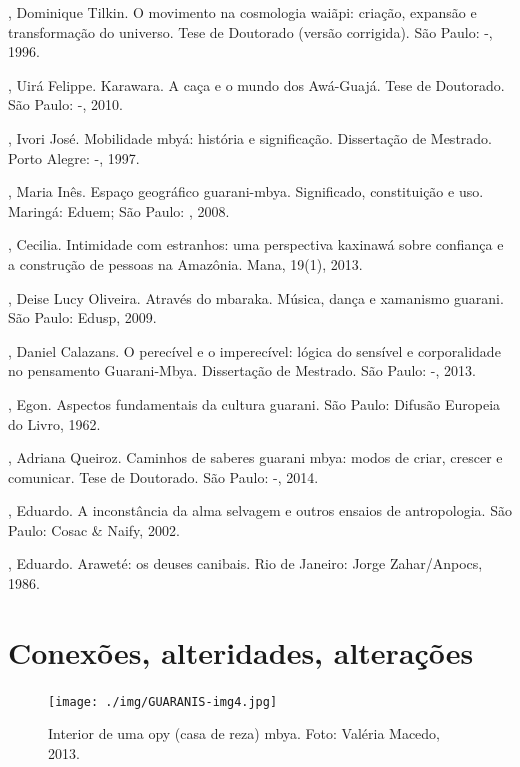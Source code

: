 \begin{Parskip}
, Dominique Tilkin. O movimento na cosmologia waiãpi:
criação, expansão e transformação do universo. Tese de Doutorado
(versão corrigida). São Paulo: -, 1996.

, Uirá Felippe. Karawara. A caça e o mundo dos Awá-Guajá.
Tese de Doutorado. São Paulo: -, 2010.

, Ivori José. Mobilidade mbyá: história e significação.
Dissertação de Mestrado. Porto Alegre: -, 1997.

, Maria Inês. Espaço geográfico guarani-mbya. Significado,
constituição e uso. Maringá: Eduem; São Paulo: , 2008.

, Cecilia. Intimidade com estranhos: uma perspectiva
kaxinawá sobre confiança e a construção de pessoas na Amazônia. Mana,
19(1), 2013.

, Deise Lucy Oliveira. Através do mbaraka. Música, dança e
xamanismo guarani. São Paulo: Edusp, 2009.

, Daniel Calazans. O perecível e o imperecível: lógica do
sensível e corporalidade no pensamento Guarani-Mbya. Dissertação de
Mestrado. São Paulo: -, 2013.

, Egon. Aspectos fundamentais da cultura guarani. São
Paulo: Difusão Europeia do Livro, 1962.

, Adriana Queiroz. Caminhos de saberes guarani mbya: modos de
criar, crescer e comunicar. Tese de Doutorado. São Paulo: -,
2014.

  , Eduardo. A inconstância da alma selvagem e
outros ensaios de antropologia. São Paulo: Cosac \& Naify, 2002.

  , Eduardo. Araweté: os deuses canibais. Rio de
Janeiro: Jorge Zahar/Anpocs, 1986.

\end{Parskip}

\part{Conexões, alteridades, alterações}
 
\begin{figure}
  \centering
 \texttt{[image: ./img/GUARANIS-img4.jpg]}	
  \hfill
  \caption{Interior de uma opy (casa de reza) mbya. Foto: Valéria Macedo, 2013.}
\end{figure}


